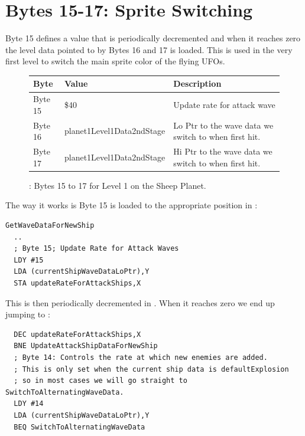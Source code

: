 \section{Bytes 15-17: Sprite Switching}
Byte 15 defines a value that is periodically decremented and when it reaches zero the level data pointed
to by Bytes 16 and 17 is loaded. This is used in the very first level to switch the main sprite color
of the flying UFOs. 

\begin{figure}[H]

  {
    \setlength{\tabcolsep}{3.0pt}
    \setlength\cmidrulewidth{\heavyrulewidth} %
    \begin{adjustbox}{width=13cm}

      \begin{tabular}{lll}
        \toprule
        Byte    & Value                     & Description                                                        \\
        \midrule
        Byte 15 & \$40                       & Update rate for attack wave                                        \\
        Byte 16 & planet1Level1Data2ndStage & Lo Ptr to the wave data we switch to when first hit.               \\
        Byte 17 & planet1Level1Data2ndStage & Hi Ptr to the wave data we switch to when first hit.               \\
        \bottomrule
      \end{tabular}
    \end{adjustbox}
  }\caption*{: Bytes 15 to 17 for Level 1 on the Sheep Planet.}
\end{figure}

The way it works is Byte 15 is loaded to the appropriate position in :

\begin{lstlisting}
GetWaveDataForNewShip
  ..
  ; Byte 15; Update Rate for Attack Waves
  LDY #15
  LDA (currentShipWaveDataLoPtr),Y
  STA updateRateForAttackShips,X
\end{lstlisting}

This is then periodically decremented in . When it reaches zero we 
end up jumping to :
\begin{lstlisting}
  DEC updateRateForAttackShips,X
  BNE UpdateAttackShipDataForNewShip
  ; Byte 14: Controls the rate at which new enemies are added.
  ; This is only set when the current ship data is defaultExplosion
  ; so in most cases we will go straight to SwitchToAlternatingWaveData.
  LDY #14
  LDA (currentShipWaveDataLoPtr),Y
  BEQ SwitchToAlternatingWaveData
\end{lstlisting}

